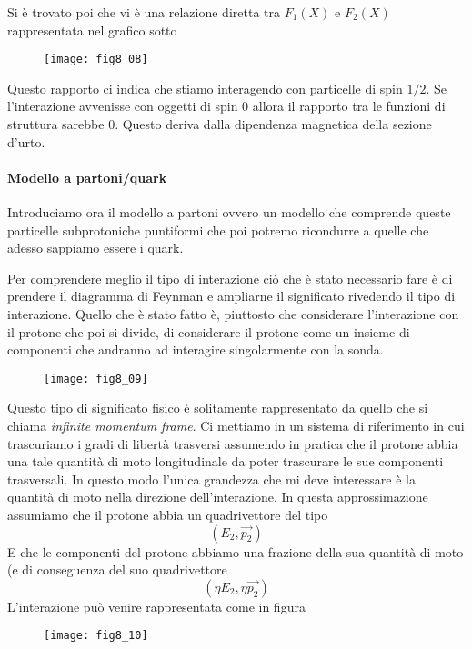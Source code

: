 Si è trovato poi che vi è una relazione diretta tra $F_1(X) $ e $F_2(X)$ rappresentata nel grafico sotto
\begin{figure}[h]
\centering
\texttt{[image: fig8\_08]}
\end{figure}

Questo rapporto ci indica che stiamo interagendo con particelle di spin $1/2$.
Se l'interazione avvenisse con oggetti di spin $0$ allora il rapporto tra le funzioni di struttura sarebbe $0$.
Questo deriva dalla dipendenza magnetica della sezione d'urto.

\paragraph{Modello a partoni/quark}
Introduciamo ora il modello a partoni ovvero un modello che comprende queste particelle subprotoniche puntiformi che poi potremo ricondurre a quelle che adesso sappiamo essere i quark.

Per comprendere meglio il tipo di interazione ciò che è stato necessario fare è di prendere il diagramma di Feynman e ampliarne il significato rivedendo il tipo di interazione.
Quello che è stato fatto è, piuttosto che considerare l'interazione con il protone che poi si divide, di considerare il protone come un insieme di componenti che andranno ad interagire singolarmente con la sonda.
\begin{figure}[h]
\centering
\texttt{[image: fig8\_09]}
\end{figure}

Questo tipo di significato fisico è solitamente rappresentato da quello che si chiama \emph{infinite momentum frame}.
Ci mettiamo in un sistema di riferimento in cui trascuriamo i gradi di libertà trasversi assumendo in pratica che il protone abbia una tale quantità di moto longitudinale da poter trascurare le sue componenti trasversali.
In questo modo l'unica grandezza che mi deve interessare è la quantità di moto nella direzione dell'interazione.
In questa approssimazione assumiamo che il protone abbia un quadrivettore del tipo
\begin{equation}
(E_2,\vec{p_2})
\end{equation}
E che le componenti del protone abbiamo una frazione della sua quantità di moto (e di conseguenza del suo quadrivettore
\begin{equation}
(\eta E_2, \eta \vec{p_2})
\end{equation}
L'interazione può venire rappresentata come in figura
\begin{figure}
\centering
\texttt{[image: fig8\_10]}
\end{figure}

